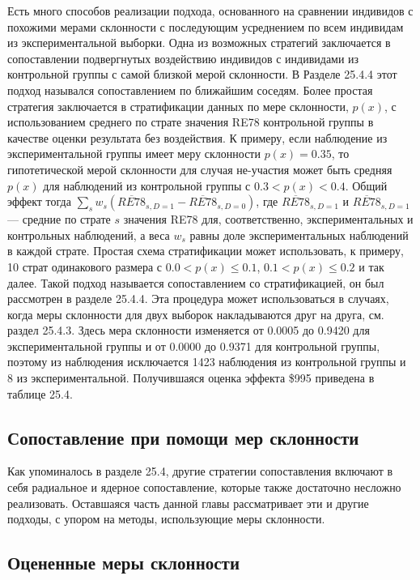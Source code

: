 Есть много способов реализации подхода, основанного на сравнении индивидов с похожими мерами склонности с последующим усреднением по всем индивидам из экспериментальной выборки. Одна из возможных стратегий заключается в сопоставлении подвергнутых воздействию индивидов с индивидами из контрольной группы с самой близкой мерой склонности. В Разделе 25.4.4 этот подход назывался сопоставлением по ближайшим соседям. Более простая стратегия заключается в стратификации данных по мере склонности, $p(x)$, с использованием среднего по страте значения RE78 контрольной группы в качестве оценки результата без воздействия. К примеру, если наблюдение из экспериментальной группы имеет меру склонности $p(x) = 0.35$, то гипотетической мерой склонности для случая не-участия может быть средняя $p(x)$ для наблюдений из контрольной группы с $0.3 < p(x) < 0.4$. Общий эффект тогда $\sum_s w_s (\overline{RE78}_{s,D=1} - \overline{RE78}_{s,D=0})$, где $\overline{RE78}_{s,D=1}$ и $\overline{RE78}_{s,D=1}$ --- средние по страте $s$ значения RE78 для, соответственно, экспериментальных и контрольных наблюдений, а веса $w_s$ равны доле экспериментальных наблюдений в каждой страте. Простая схема стратификации может использовать, к примеру, 10 страт одинакового размера с $0.0 < p(x) \leq 0.1$, $0.1 < p(x) \leq 0.2$ и так далее. Такой подход называется сопоставлением со стратификацией, он был рассмотрен в разделе 25.4.4. Эта процедура может использоваться в случаях, когда меры склонности для двух выборок накладываются друг на друга, см. раздел 25.4.3. Здесь мера склонности изменяется от 0.0005 до 0.9420 для экспериментальной группы и от 0.0000 до 0.9371 для контрольной группы, поэтому из наблюдения исключается 1423 наблюдения из контрольной группы и 8 из экспериментальной. Получившаяся оценка эффекта \$995 приведена в таблице 25.4. 

\subsection{Сопоставление при помощи мер склонности}

Как упоминалось в разделе 25.4, другие стратегии сопоставления включают в себя радиальное и ядерное сопоставление, которые также достаточно несложно реализовать. Оставшаяся часть данной главы рассматривает эти и другие подходы, с упором на методы, использующие меры склонности. 

\subsection*{Оцененные меры склонности}

